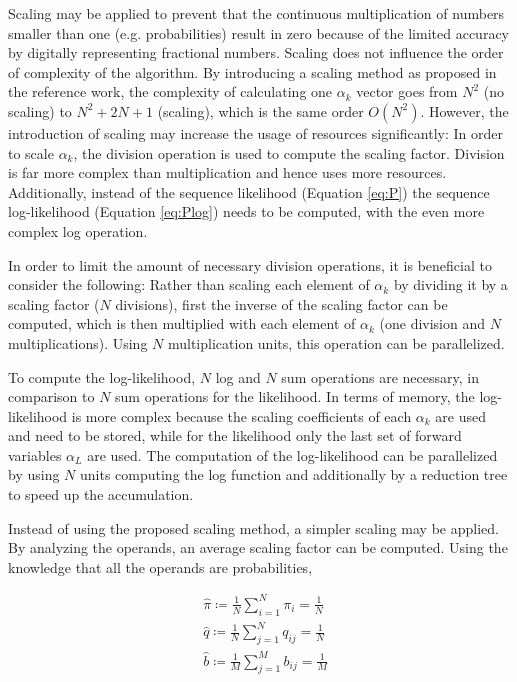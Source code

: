 \documentclass[mscthesis]{usiinfthesis}
\begin{document}
Scaling may be applied to prevent that the continuous multiplication of numbers
smaller than one (e.g. probabilities) result in zero because of the limited
accuracy by digitally representing fractional numbers. Scaling does not
influence the order of complexity of the algorithm. By introducing a scaling
method as proposed in the reference work, the complexity of calculating one
$\alpha_k$ vector goes from $N^2$ (no scaling) to $N^2 + 2N + 1$ (scaling),
which is the same order $O(N^2)$. However, the introduction of scaling may
increase the usage of resources significantly: In order to scale $\alpha_k$,
the division operation is used to compute the scaling factor. Division is far
more complex than multiplication and hence uses more resources. Additionally,
instead of the sequence likelihood (Equation \ref{eq:P}) the sequence
log-likelihood (Equation \ref{eq:Plog}) needs to be computed, with the even
more complex log operation.

In order to limit the amount of necessary division operations, it is beneficial
to consider the following: Rather than scaling each element of $\alpha_k$ by
dividing it by a scaling factor ($N$ divisions), first the inverse of the
scaling factor can be computed, which is then multiplied with each element of
$\alpha_k$ (one division and $N$ multiplications). Using $N$ multiplication
units, this operation can be parallelized.

To compute the log-likelihood, $N$ log and $N$ sum operations are necessary, in
comparison to $N$ sum operations for the likelihood. In terms of memory, the
log-likelihood is more complex because the scaling coefficients of each
$\alpha_k$ are used and need to be stored, while for the likelihood only the
last set of forward variables $\alpha_L$ are used. The computation of the
log-likelihood can be parallelized by using $N$ units computing the log
function and additionally by a reduction tree to speed up the accumulation.

Instead of using the proposed scaling method, a simpler scaling may be applied.
By analyzing the operands, an average scaling factor can be computed. Using the
knowledge that all the operands are probabilities,

\begin{equation}\begin{split}
    \label{eq:scaling_sum}
    &\hat{\pi} \coloneqq \frac{1}{N}\sum\limits_{i=1}^{N} \pi_i = \frac{1}{N} \\
    &\hat{q} \coloneqq \frac{1}{N}\sum\limits_{j=1}^{N} q_{ij} = \frac{1}{N} \\
    &\hat{b} \coloneqq \frac{1}{M}\sum\limits_{j=1}^{M} b_{ij} = \frac{1}{M}
\end{split}\end{equation}
\end{document}
